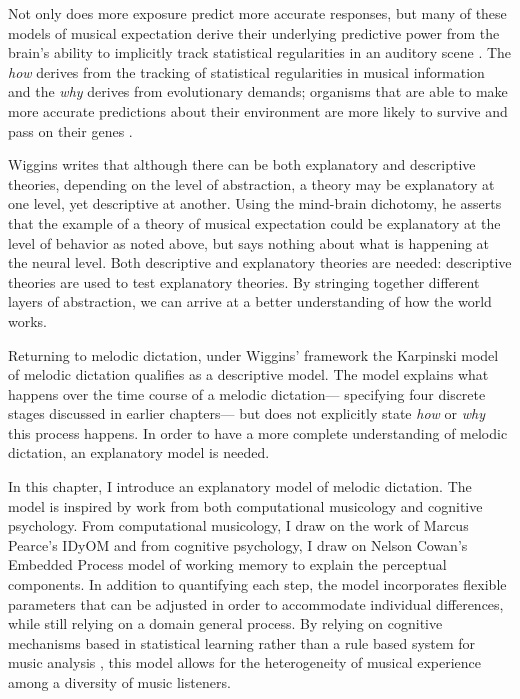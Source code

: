 \documentclass[12pt,]{book}
\begin{document}
Not only does more exposure predict more accurate responses, but many of these models of musical expectation derive their underlying predictive power from the brain's ability to implicitly track statistical regularities in an auditory scene \citep{saffranStatisticalLearningTone1999, margulisRepeatHowMusic2014}.
The \emph{how} derives from the tracking of statistical regularities in musical information and the \emph{why} derives from evolutionary demands; organisms that are able to make more accurate predictions about their environment are more likely to survive and pass on their genes \citep{huronSweetAnticipation2006}.

Wiggins writes that although there can be both explanatory and descriptive theories, depending on the level of abstraction, a theory may be explanatory at one level, yet descriptive at another.
Using the mind-brain dichotomy, he asserts that the example of a theory of musical expectation could be explanatory at the level of behavior as noted above, but says nothing about what is happening at the neural level.
Both descriptive and explanatory theories are needed: descriptive theories are used to test explanatory theories.
By stringing together different layers of abstraction, we can arrive at a better understanding of how the world works.

Returning to melodic dictation, under Wiggins' framework the Karpinski model of melodic dictation \citep{karpinskiAuralSkillsAcquisition2000, karpinskiModelMusicPerception1990} qualifies as a descriptive model.
The model explains what happens over the time course of a melodic dictation--- specifying four discrete stages discussed in earlier chapters--- but does not explicitly state \emph{how} or \emph{why} this process happens.
In order to have a more complete understanding of melodic dictation, an explanatory model is needed.

In this chapter, I introduce an explanatory model of melodic dictation.
The model is inspired by work from both computational musicology and cognitive psychology.
From computational musicology, I draw on the work of Marcus Pearce's IDyOM \citep{pearceConstructionEvaluationStatistical2005} and from cognitive psychology, I draw on Nelson Cowan's Embedded Process model of working memory \citep{cowanEvolvingConceptionsMemory1988, cowanMagicalMysteryFour2010} to explain the perceptual components.
In addition to quantifying each step, the model incorporates flexible parameters that can be adjusted in order to accommodate individual differences, while still relying on a domain general process.
By relying on cognitive mechanisms based in statistical learning rather than a rule based system for music analysis \citep{lerdahlGenerativeTheoryTonal1986, narmourAnalysisCognitionBasic1990, narmourAnalysisCognitionMelodic1992, temperleyCognitionBasicMusical2004}, this model allows for the heterogeneity of musical experience among a diversity of music listeners.
\end{document}
